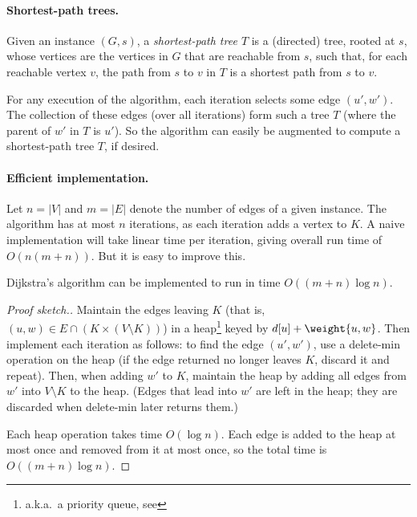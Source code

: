 \paragraph{Shortest-path trees.}
Given an instance $(G, s)$,
a \emph{shortest-path tree $T$}
is a (directed) tree, rooted at $s$,
whose vertices are the vertices in $G$ that are reachable from $s$,
such that, for each reachable vertex $v$,
the path from $s$ to $v$ in $T$
is a shortest path from $s$ to $v$.

For any execution of the algorithm,
each iteration selects some edge $(u',w')$.
The collection of these edges (over all iterations)
form such a tree $T$
(where the parent of $w'$ in $T$ is $u'$).
So the algorithm can easily be augmented to compute a shortest-path tree $T$, if desired.

\paragraph{Efficient implementation.}
Let $n=|V|$ and $m=|E|$ denote the number of edges of a given instance.
The algorithm has at most $n$ iterations, as each iteration adds a vertex to $K$.
A naive implementation will take linear time per iteration,
giving overall run time of $O(n(m+n))$.
But it is easy to improve this.

\begin{lemma}
  Dijkstra's algorithm can be implemented to run in time $O((m+n)\log n)$.
\end{lemma}
\begin{proof}[Proof sketch.]
  Maintain the edges leaving $K$
  (that is, $(u,w)\in E\cap (K\times (V\setminus K))$) in a heap\footnote
  {a.k.a.~a priority queue, see }
  keyed by $d[u] + \weight {u,w}$.
  Then implement each iteration as follows:
  to find the edge $(u', w')$, use a \textsf{delete-min} operation on the heap
  (if the edge returned no longer leaves $K$, discard it and repeat).
  Then, when adding $w'$ to $K$, maintain the heap
  by adding all edges from $w'$ into $V\setminus K$ to the heap.
  (Edges that lead into $w'$ are left in the heap;
  they are discarded when \textsf{delete-min} later returns them.)

  Each heap operation takes time $O(\log n)$.
  Each edge is added to the heap at most once and removed from it at most once,
  so the total time is $O((m+n)\log n)$.
\end{proof}

